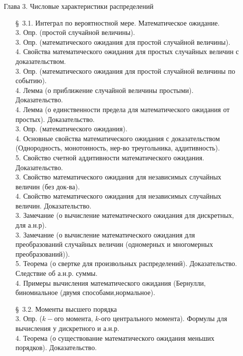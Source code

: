 \documentclass[10pt]{amsart}
\begin{document}
\begin{enumerate}
    
\item[Глава 3.] Числовые характеристики распределений \\
    
\begin{enumerate}
\item[\S\, 3.1.] Интеграл по вероятностной мере. Математическое ожидание. \\
3. Опр. (простой случайной величины). \\
3. Опр. (математического ожидания для простой случайной величины). \\
4. Свойства математического ожидания для  простых случайных величин с доказательством. \\
3. Опр. (математического ожидания для простой случайной величины по событию). \\
4. Лемма (о приближение случайной величины простыми). Доказательство. \\
4. Лемма (о единственности предела для математического ожидания от простых). Доказательство. \\ 
3. Опр. (математического ожидания). \\
4. Основные свойства математического ожидания с доказательством (Однородность, монотонность, нер-во треугольника, аддитивность). \\
5.  Свойство счетной аддитивности математического ожидания. Доказательство. \\
3. Свойство  математического ожидания для независимых случайных величин (без док-ва). \\
4. Свойство  математического ожидания для независимых случайных величин. Доказательство. \\
3. Замечание (о вычисление  математического ожидания для дискретных, для а.н.р). \\
3. Замечание (о вычисление  математического ожидания для преобразований случайных величин (одномерных и многомерных преобразований)). \\
5. Теорема (о свертке для произвольных распределений). Доказательство. Следствие об а.н.р. суммы. \\ 
4. Примеры вычисления математического ожидания (Бернулли, биномиальное (двумя способами,нормальное). \\


\item[\S\, 3.2.] Моменты высшего порядка \\
3. Опр. ($k-$ого момента, $k$-ого центрального момента). Формулы для вычисления у дискретного и а.н.р. \\
4. Теорема (о существование математического ожидания меньших порядков). Доказательство. \\



\end{enumerate}
\end{enumerate}
\end{document}
